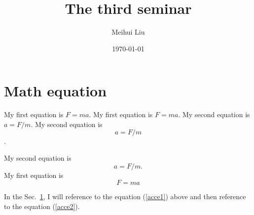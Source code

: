 \documentclass[letterpaper, notitlepage, 12pt]{article} %
\begin{document}
\title{The third seminar}%
\author{Meihui Liu}%
\date{\today}%
\maketitle

\section{Math equation}
\label{equations}
My first equation is $F=ma$. My first equation is $F=m   a$.
My second equation is \( a=F/m\). My second equation is \[ a=F/m\].

My second equation is
\begin{equation}
\label{acce1}
a=F/m.
\end{equation}
My first equation is
\begin{equation}
\label{acce2}
F = ma
\end{equation}

In the Sec.~\ref{equations}, I will reference to the equation (\ref{acce1}) above and then reference to the equation (\ref{acce2}).
\end{document}
